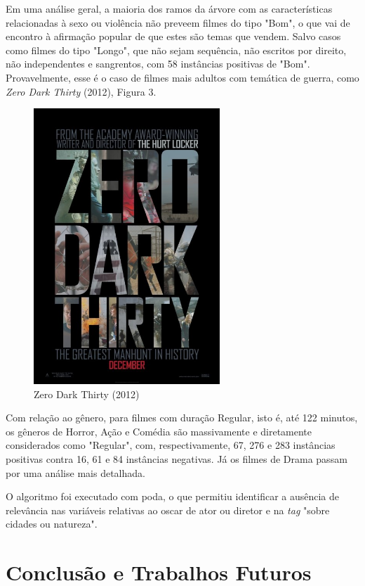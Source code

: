 \documentclass[twoside]{article}
\begin{document}
\begin{multicols}{2}
Em uma análise geral, a maioria dos ramos da árvore com as características relacionadas à sexo ou violência não preveem filmes do tipo "Bom", o que vai de encontro à afirmação popular de que estes são temas que vendem. Salvo casos como filmes do tipo "Longo", que não sejam sequência, não escritos por direito, não independentes e sangrentos, com 58 instâncias positivas de "Bom". Provavelmente, esse é o caso de filmes mais adultos com temática de guerra, como \textit{Zero Dark Thirty} (2012), Figura 3.

\begin{figure}[H]
\centering
\includegraphics[width=7cm]{zero.jpg}
\caption{Zero Dark Thirty (2012)}
\label{Rotulo}
\end{figure} 


Com relação ao gênero, para filmes com duração Regular, isto é, até 122 minutos, os gêneros de Horror, Ação e Comédia são massivamente e diretamente considerados como "Regular", com, respectivamente, 67, 276 e 283 instâncias positivas contra 16, 61 e 84 instâncias negativas. Já os filmes de Drama passam por uma análise mais detalhada.

O algoritmo foi executado com poda, o que permitiu identificar a ausência de relevância nas variáveis relativas ao oscar de ator ou diretor e na \textit{tag} "sobre cidades ou natureza".

\section{Conclusão e Trabalhos Futuros}


\end{multicols}
\end{document}
